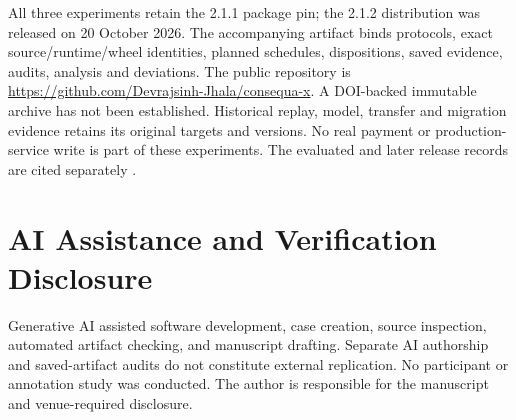 \documentclass[conference]{IEEEtran}
\begin{document}
All three experiments retain the 2.1.1 package pin; the 2.1.2 distribution was released on 20 October 2026. The accompanying artifact binds protocols, exact source/runtime/wheel identities, planned schedules, dispositions, saved evidence, audits, analysis and deviations. The public repository is \url{https://github.com/Devrajsinh-Jhala/consequa-x}. A DOI-backed immutable archive has not been established. Historical replay, model, transfer and migration evidence retains its original targets and versions. No real payment or production-service write is part of these experiments. The evaluated and later release records are cited separately \cite{artifact,currentrelease}.

\section*{AI Assistance and Verification Disclosure}

Generative AI assisted software development, case creation, source inspection, automated artifact checking, and manuscript drafting. Separate AI authorship and saved-artifact audits do not constitute external replication. No participant or annotation study was conducted. The author is responsible for the manuscript and venue-required disclosure.
\end{document}
